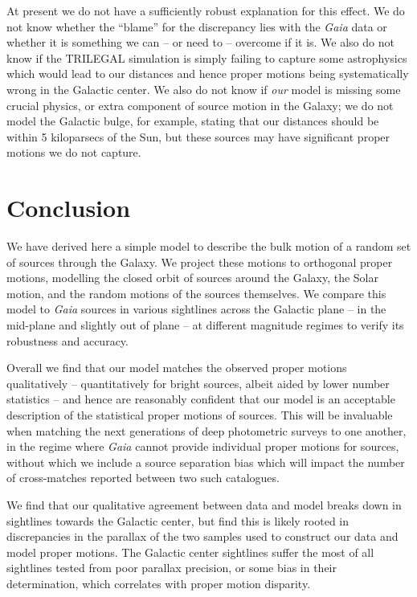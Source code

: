 \documentclass[fleqn,usenatbib]{mnras}
\begin{document}
At present we do not have a sufficiently robust explanation for this effect. We do not know whether the ``blame'' for the discrepancy lies with the \textit{Gaia} data or whether it is something we can -- or need to -- overcome if it is. We also do not know if the TRILEGAL simulation is simply failing to capture some astrophysics which would lead to our distances and hence proper motions being systematically wrong in the Galactic center. We also do not know if \textit{our} model is missing some crucial physics, or extra component of source motion in the Galaxy; we do not model the Galactic bulge, for example, stating that our distances should be within 5 kiloparsecs of the Sun, but these sources may have significant proper motions we do not capture.

\section{Conclusion}
We have derived here a simple model to describe the bulk motion of a random set of sources through the Galaxy. We project these motions to orthogonal proper motions, modelling the closed orbit of sources around the Galaxy, the Solar motion, and the random motions of the sources themselves. We compare this model to \textit{Gaia} sources in various sightlines across the Galactic plane -- in the mid-plane and slightly out of plane -- at different magnitude regimes to verify its robustness and accuracy.

Overall we find that our model matches the observed proper motions qualitatively -- quantitatively for bright sources, albeit aided by lower number statistics -- and hence are reasonably confident that our model is an acceptable description of the statistical proper motions of sources. This will be invaluable when matching the next generations of deep photometric surveys to one another, in the regime where \textit{Gaia} cannot provide individual proper motions for sources, without which we include a source separation bias which will impact the number of cross-matches reported between two such catalogues.

We find that our qualitative agreement between data and model breaks down in sightlines towards the Galactic center, but find this is likely rooted in discrepancies in the parallax of the two samples used to construct our data and model proper motions. The Galactic center sightlines suffer the most of all sightlines tested from poor parallax precision, or some bias in their determination, which correlates with proper motion disparity.
\end{document}
